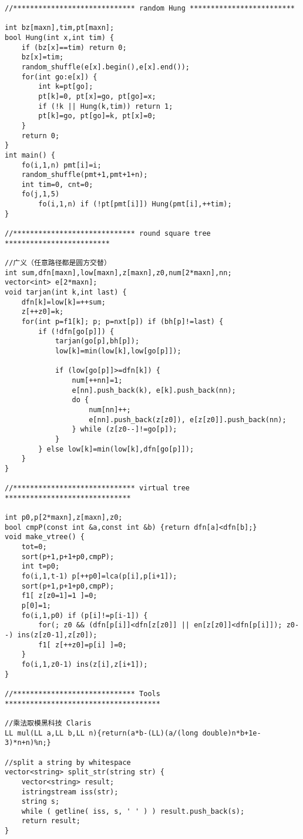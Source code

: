 \documentclass{article}
\begin{document}
\begin{multicols}{2}
\begin{lstlisting}
//***************************** random Hung *************************

int bz[maxn],tim,pt[maxn];
bool Hung(int x,int tim) {
    if (bz[x]==tim) return 0;
    bz[x]=tim;
    random_shuffle(e[x].begin(),e[x].end());
    for(int go:e[x]) {
        int k=pt[go];
        pt[k]=0, pt[x]=go, pt[go]=x;
        if (!k || Hung(k,tim)) return 1;
        pt[k]=go, pt[go]=k, pt[x]=0;
    }
    return 0;
}
int main() {
    fo(i,1,n) pmt[i]=i;
    random_shuffle(pmt+1,pmt+1+n);
    int tim=0, cnt=0;
    fo(j,1,5)
        fo(i,1,n) if (!pt[pmt[i]]) Hung(pmt[i],++tim);
}

//***************************** round square tree *************************

//广义（任意路径都是圆方交替）
int sum,dfn[maxn],low[maxn],z[maxn],z0,num[2*maxn],nn;
vector<int> e[2*maxn];
void tarjan(int k,int last) {
    dfn[k]=low[k]=++sum;
    z[++z0]=k;
    for(int p=f1[k]; p; p=nxt[p]) if (bh[p]!=last) {
        if (!dfn[go[p]]) {
            tarjan(go[p],bh[p]);
            low[k]=min(low[k],low[go[p]]);

            if (low[go[p]]>=dfn[k]) {
                num[++nn]=1;
                e[nn].push_back(k), e[k].push_back(nn);
                do {
                    num[nn]++;
                    e[nn].push_back(z[z0]), e[z[z0]].push_back(nn);
                } while (z[z0--]!=go[p]);
            }
        } else low[k]=min(low[k],dfn[go[p]]);
    }
}

//***************************** virtual tree ******************************

int p0,p[2*maxn],z[maxn],z0;
bool cmpP(const int &a,const int &b) {return dfn[a]<dfn[b];}
void make_vtree() {
    tot=0;
    sort(p+1,p+1+p0,cmpP);
    int t=p0;
    fo(i,1,t-1) p[++p0]=lca(p[i],p[i+1]);
    sort(p+1,p+1+p0,cmpP);
    f1[ z[z0=1]=1 ]=0;
    p[0]=1;
    fo(i,1,p0) if (p[i]!=p[i-1]) {
        for(; z0 && (dfn[p[i]]<dfn[z[z0]] || en[z[z0]]<dfn[p[i]]); z0--) ins(z[z0-1],z[z0]);
        f1[ z[++z0]=p[i] ]=0;
    }
    fo(i,1,z0-1) ins(z[i],z[i+1]);
}

//***************************** Tools *************************************

//乘法取模黑科技 Claris
LL mul(LL a,LL b,LL n){return(a*b-(LL)(a/(long double)n*b+1e-3)*n+n)%n;}

//split a string by whitespace
vector<string> split_str(string str) {
    vector<string> result;
    istringstream iss(str);
    string s;
    while ( getline( iss, s, ' ' ) ) result.push_back(s);
    return result;
}
\end{lstlisting}

\end{multicols}
\end{document}
